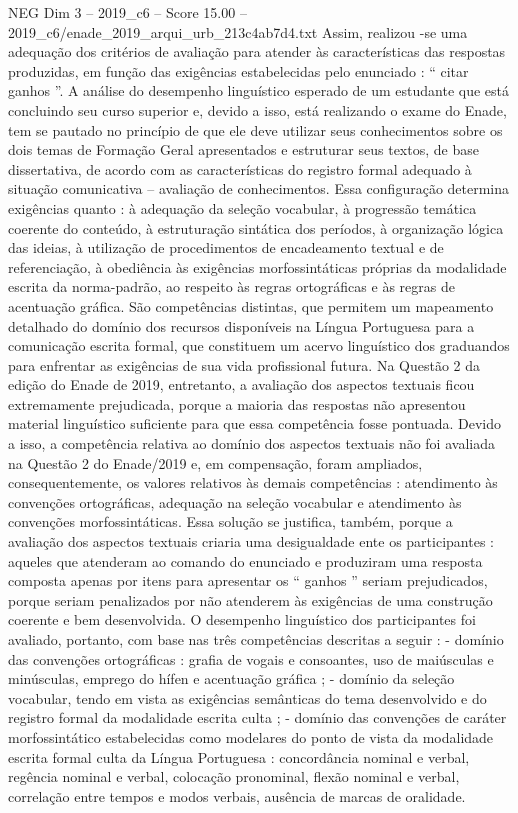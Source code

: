 \begin{textsample}{NEG Dim 3 – 2019\_c6 – Score 15.00 – 2019\_c6/enade\_2019\_arqui\_urb\_213c4ab7d4.txt}
Assim, realizou -se uma adequação dos critérios de avaliação para atender às características das respostas produzidas, em função das exigências estabelecidas pelo enunciado : “ citar ganhos ”.
A análise do desempenho linguístico esperado de um estudante que está concluindo seu curso superior e, devido a isso, está realizando o exame do Enade, tem se pautado no princípio de que ele deve utilizar seus conhecimentos sobre os dois temas de Formação Geral apresentados e estruturar seus textos, de base dissertativa, de acordo com as características do registro formal adequado à situação comunicativa – avaliação de conhecimentos.
Essa configuração determina exigências quanto : à adequação da seleção vocabular, à progressão temática coerente do conteúdo, à estruturação sintática dos períodos, à organização lógica das ideias, à utilização de procedimentos de encadeamento textual e de referenciação, à obediência às exigências morfossintáticas próprias da modalidade escrita da norma-padrão, ao respeito às regras ortográficas e às regras de acentuação gráfica.
São competências distintas, que permitem um mapeamento detalhado do domínio dos recursos disponíveis na Língua Portuguesa para a comunicação escrita formal, que constituem um acervo linguístico dos graduandos para enfrentar as exigências de sua vida profissional futura.
Na Questão 2 da edição do Enade de 2019, entretanto, a avaliação dos aspectos textuais ficou extremamente prejudicada, porque a maioria das respostas não apresentou material linguístico suficiente para que essa competência fosse pontuada.
Devido a isso, a competência relativa ao domínio dos aspectos textuais não foi avaliada na Questão 2 do Enade/2019 e, em compensação, foram ampliados, consequentemente, os valores relativos às demais competências : atendimento às convenções ortográficas, adequação na seleção vocabular e atendimento às convenções morfossintáticas.
Essa solução se justifica, também, porque a avaliação dos aspectos textuais criaria uma desigualdade ente os participantes : aqueles que atenderam ao comando do enunciado e produziram uma resposta composta apenas por itens para apresentar os “ ganhos ” seriam prejudicados, porque seriam penalizados por não atenderem às exigências de uma construção coerente e bem desenvolvida.
O desempenho linguístico dos participantes foi avaliado, portanto, com base nas três competências descritas a seguir : - domínio das convenções ortográficas : grafia de vogais e consoantes, uso de maiúsculas e minúsculas, emprego do hífen e acentuação gráfica ; - domínio da seleção vocabular, tendo em vista as exigências semânticas do tema desenvolvido e do registro formal da modalidade escrita culta ; - domínio das convenções de caráter morfossintático estabelecidas como modelares do ponto de vista da modalidade escrita formal culta da Língua Portuguesa : concordância nominal e verbal, regência nominal e verbal, colocação pronominal, flexão nominal e verbal, correlação entre tempos e modos verbais, ausência de marcas de oralidade.

\end{textsample}
